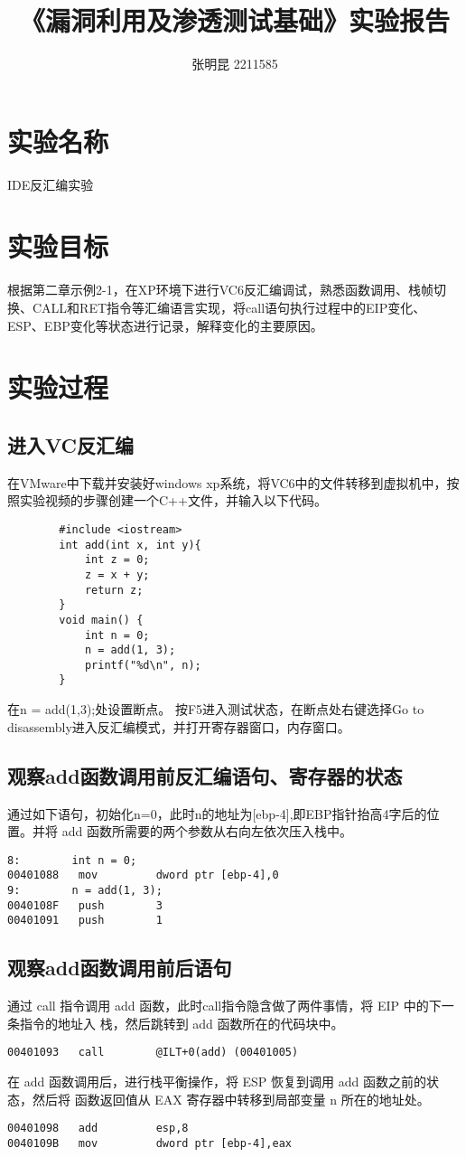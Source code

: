 \documentclass{ctexart}
\title{《漏洞利用及渗透测试基础》实验报告}
\author{张明昆  2211585}
\date{}
\begin{document}
    \maketitle
    \section{实验名称}
    IDE反汇编实验
    \section{实验目标}
    根据第二章示例2-1，在XP环境下进行VC6反汇编调试，熟悉函数调用、栈帧切换、CALL和RET指令等汇编语言实现，将call语句执行过程中的EIP变化、ESP、EBP变化等状态进行记录，解释变化的主要原因。 
    \section{实验过程}
    \subsection{进入VC反汇编}
    在VMware中下载并安装好windows xp系统，将VC6中的文件转移到虚拟机中，按照实验视频的步骤创建一个C++文件，并输入以下代码。
    \begin{lstlisting}
        #include <iostream>
        int add(int x, int y){
            int z = 0;
            z = x + y;
            return z;
        }
        void main() {
            int n = 0;
            n = add(1, 3);
            printf("%d\n", n);
        }
    \end{lstlisting}

    在n = add(1,3);处设置断点。
    按F5进入测试状态，在断点处右键选择Go to disassembly进入反汇编模式，并打开寄存器窗口，内存窗口。
    \subsection{观察add函数调用前反汇编语句、寄存器的状态}
    通过如下语句，初始化n=0，此时n的地址为[ebp-4],即EBP指针抬高4字后的位置。并将 add 函数所需要的两个参数从右向左依次压入栈中。
    \begin{lstlisting}
8:        int n = 0;
00401088   mov         dword ptr [ebp-4],0
9:        n = add(1, 3);
0040108F   push        3
00401091   push        1
    \end{lstlisting}
    \subsection{观察add函数调用前后语句}
    通过 call 指令调用 add 函数，此时call指令隐含做了两件事情，将 EIP 中的下一条指令的地址入
    栈，然后跳转到 add 函数所在的代码块中。
    \begin{lstlisting}
00401093   call        @ILT+0(add) (00401005)      
    \end{lstlisting}
    在 add 函数调用后，进行栈平衡操作，将 ESP 恢复到调用 add 函数之前的状态，然后将
    函数返回值从 EAX 寄存器中转移到局部变量 n 所在的地址处。
    \begin{lstlisting}
00401098   add         esp,8 
0040109B   mov         dword ptr [ebp-4],eax
    \end{lstlisting}
\end{document}
